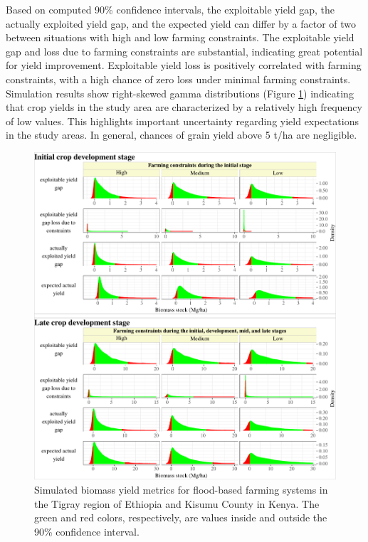 \documentclass[]{elsarticle} %
\begin{document}
Based on computed 90\% confidence intervals, the exploitable yield gap, the actually exploited yield gap, and the expected yield can differ by a factor of two between situations with high and low farming constraints. The exploitable yield gap and loss due to farming constraints are substantial, indicating great potential for yield improvement. Exploitable yield loss is positively correlated with farming constraints, with a high chance of zero loss under minimal farming constraints. Simulation results show right-skewed gamma distributions (Figure \ref{fig:fig8}) indicating that crop yields in the study area are characterized by a relatively high frequency of low values. This highlights important uncertainty regarding yield expectations in the study areas. In general, chances of grain yield above 5 t/ha are negligible.



\begin{figure}[!h]

{\centering \includegraphics[width=1\linewidth,]{figures/Modelling_FBFS_biomass_yield_Initial_and_late_stage} 

}

\caption{Simulated biomass yield metrics for flood-based farming systems in the Tigray region of Ethiopia and Kisumu County in Kenya. The green and red colors, respectively, are values inside and outside the 90\% confidence interval.}\label{fig:fig8}
\end{figure}
\end{document}
